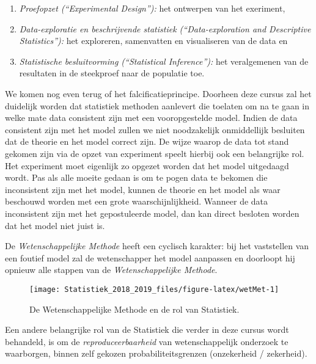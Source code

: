\documentclass[12pt,dutch,coursenotes]{book}
\providecommand{\tightlist}{%
  \setlength{\itemsep}{0pt}\setlength{\parskip}{0pt}}
\theoremstyle{definition}
\theoremstyle{definition}
\theoremstyle{definition}
\theoremstyle{remark}
\begin{document}
\begin{itemize}
  \begin{enumerate}
  \def\labelenumi{\arabic{enumi}.}
  \tightlist
  \item
    \emph{Proefopzet (``Experimental Design''):} het ontwerpen van het
    exeriment,
  \item
    \emph{Data-exploratie en beschrijvende statistiek
    (``Data-exploration and Descriptive Statistics''):} het exploreren,
    samenvatten en visualiseren van de data en
  \item
    \emph{Statistische besluitvorming (``Statistical Inference''):} het
    veralgemenen van de resultaten in de steekproef naar de populatie
    toe.
  \end{enumerate}
\end{itemize}

We komen nog even terug of het falcificatieprincipe. Doorheen deze
cursus zal het duidelijk worden dat statistiek methoden aanlevert die
toelaten om na te gaan in welke mate data consistent zijn met een
vooropgestelde model. Indien de data consistent zijn met het model
zullen we niet noodzakelijk onmiddellijk besluiten dat de theorie en het
model correct zijn. De wijze waarop de data tot stand gekomen zijn via
de opzet van experiment speelt hierbij ook een belangrijke rol. Het
experiment moet eigenlijk zo opgezet worden dat het model uitgedaagd
wordt. Pas als alle moeite gedaan is om te pogen data te bekomen die
inconsistent zijn met het model, kunnen de theorie en het model als waar
beschouwd worden met een grote waarschijnlijkheid. Wanneer de data
inconsistent zijn met het gepostuleerde model, dan kan direct besloten
worden dat het model niet juist is.

De \emph{Wetenschappelijke Methode} heeft een cyclisch karakter: bij het
vaststellen van een foutief model zal de wetenschapper het model
aanpassen en doorloopt hij opnieuw alle stappen van de
\emph{Wetenschappelijke Methode}.

\begin{figure}

{\centering \texttt{[image: Statistiek\_2018\_2019\_files/figure-latex/wetMet-1]} 

}

\caption{De Wetenschappelijke Methode en de rol van Statistiek.}\label{fig:wetMet}
\end{figure}

Een andere belangrijke rol van de Statistiek die verder in deze cursus
wordt behandeld, is om de \emph{reproduceerbaarheid} van
wetenschappelijk onderzoek te waarborgen, binnen zelf gekozen
probabiliteitsgrenzen (onzekerheid / zekerheid).
\end{document}
